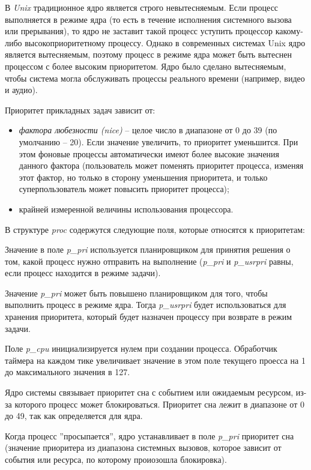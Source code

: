 В \textit{Unix} традиционное ядро является строго невытесняемым. Если процесс выполняется в режиме ядра (то есть в течение исполнения системного вызова или прерывания), то ядро не заставит такой процесс уступить процессор какому-либо высокоприоритетному процессу. Однако в современных системах Unix ядро является вытесняемым, поэтому процесс в режиме ядра может быть вытеснен процессом с более высоким приоритетом. Ядро было сделано вытесняемым, чтобы система могла обслуживать процессы реального времени (например, видео и аудио).

Приоритет прикладных задач зависит от:

\begin{itemize}
    \item \textit{фактора любезности (nice)} -- целое число в диапазоне от 0 до 39 (по умолчанию -- 20). Если значение увеличить, то приоритет уменьшится. При этом фоновые процессы автоматически имеют более высокие значения данного фактора (пользователь может поменять приоритет процесса, изменяя этот фактор, но только в сторону уменьшения приоритета, и только суперпользователь может повысить приоритет процесса);
    \item крайней измеренной величины использования процессора.
\end{itemize}

В структуре \textit{proc} содержутся следующие поля, которые относятся к приоритетам:


Значение в поле \textit{p\_pri} используется планировщиком для принятия решения о том, какой процесс нужно отправить на выполнение (\textit{p\_pri} и \textit{p\_usrpri} равны, если процесс находится в режиме задачи).

Значение \textit{p\_pri} может быть повышено планировщиком для того, чтобы выполнить процесс в режиме ядра. Тогда \textit{p\_usrpri} будет использоваться для хранения приоритета, который будет назначен процессу при возврате в режим задачи.

Поле \textit{p\_cpu} инициализируется нулем при создании процесса. Обработчик таймера на каждом тике увеличивает значение в этом поле текущего проесса на 1 до максимального значения в 127.

Ядро системы связывает приоритет сна с событием или ожидаемым ресурсом, из-за которого процесс может блокироваться. Приоритет сна лежит в диапазоне от 0 до 49, так как определяется для ядра.

Когда процесс ''просыпается'', ядро устанавливает в поле \textit{p\_pri} приоритет сна (значение приоритера из диапазона системных вызовов, которое зависит от события или ресурса, по которому проиозошла блокировка).

